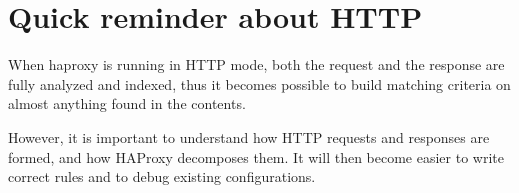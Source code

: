 
\chapter{Quick reminder about HTTP}

When haproxy is running in HTTP mode, both the request and the response are
fully analyzed and indexed, thus it becomes possible to build matching criteria
on almost anything found in the contents.

However, it is important to understand how HTTP requests and responses are
formed, and how HAProxy decomposes them. It will then become easier to write
correct rules and to debug existing configurations.

